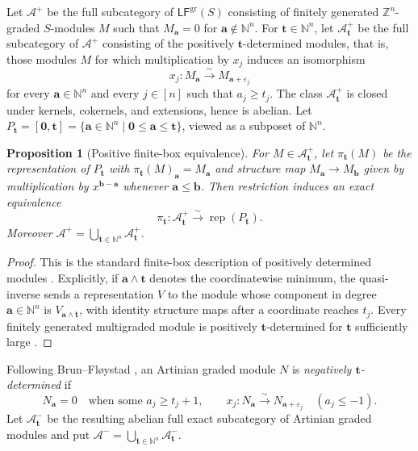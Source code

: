 \documentclass[10pt,a4paper]{amsart}
\newtheorem{proposition}[theorem]{Proposition}
\newcommand{\Rep}{\operatorname{rep}}
\newcommand{\LFgr}{\mathsf{LF}^{\mathrm{gr}}(S)}
\begin{document}
Let $\mathcal A^+$ be the full subcategory of $\LFgr$ consisting of finitely
generated $\mathbb Z^n$-graded $S$-modules $M$ such that
$M_{\mathbf a}=0$ for $\mathbf a\notin\mathbb N^n$.  For $\mathbf t\in\mathbb N^n$, let $\mathcal A^+_{\mathbf t}$ be the full
subcategory of $\mathcal A^+$ consisting of the positively
$\mathbf t$-determined modules, that is, those modules $M$ for which
multiplication by $x_j$ induces an isomorphism
\[
x_j:M_{\mathbf a}\xrightarrow{\sim}M_{\mathbf a+\varepsilon_j}
\]
for every $\mathbf a\in\mathbb N^n$ and every $j\in[n]$ such that
$a_j\ge t_j$.
The class $\mathcal A^+_{\mathbf t}$ is closed under kernels, cokernels, and
extensions, hence is abelian. Let $P_{\mathbf t}=[\mathbf0,\mathbf t]
=\{\mathbf a\in\mathbb N^n\mid \mathbf0\le\mathbf a\le\mathbf t\}$,
viewed as a subposet of $\mathbb N^n$.

\begin{proposition}[Positive finite-box equivalence]\label{prop:positive-box}
For $M\in\mathcal A^+_{\mathbf t}$, let $\pi_{\mathbf t}(M)$ be the
representation of $P_{\mathbf t}$ with
$\pi_{\mathbf t}(M)_{\mathbf a}=M_{\mathbf a}$ and structure map
$M_{\mathbf a}\to M_{\mathbf b}$ given by multiplication by
$x^{\mathbf b-\mathbf a}$ whenever $\mathbf a\le\mathbf b$.
Then restriction induces an exact equivalence
\[
\pi_{\mathbf t}:\mathcal A^+_{\mathbf t}\xrightarrow{\sim}\Rep(P_{\mathbf t}).
\]
Moreover $\mathcal A^+=\bigcup_{\mathbf t\in\mathbb N^n}\mathcal A^+_{\mathbf t}$.
\end{proposition}
\begin{proof}
This is the standard finite-box description of positively determined modules
\cite{BF,Miller}.  Explicitly, if $\mathbf a\wedge\mathbf t$ denotes the
coordinatewise minimum, the quasi-inverse sends a representation $V$ to the
module whose component in degree $\mathbf a\in\mathbb N^n$ is
$V_{\mathbf a\wedge\mathbf t}$, with identity structure maps after a
coordinate reaches $t_j$.  Every finitely generated multigraded module is positively
$\mathbf t$-determined for $\mathbf t$ sufficiently large \cite{Miller}.
\end{proof}

Following Brun--Fl\o ystad \cite[Remark~2.9]{BF}, an Artinian graded module
$N$ is \emph{negatively $\mathbf t$-determined} if
\[
N_{\mathbf a}=0\quad\text{when some }a_j\ge t_j+1,
\qquad
x_j:N_{\mathbf a}\xrightarrow{\sim}N_{\mathbf a+\varepsilon_j}
\quad(a_j\le-1).
\]
Let $\mathcal A^-_{\mathbf t}$ be the resulting abelian full exact subcategory
of Artinian graded modules and put
$\mathcal A^-=\bigcup_{\mathbf t\in\mathbb N^n}\mathcal A^-_{\mathbf t}$.
\end{document}

